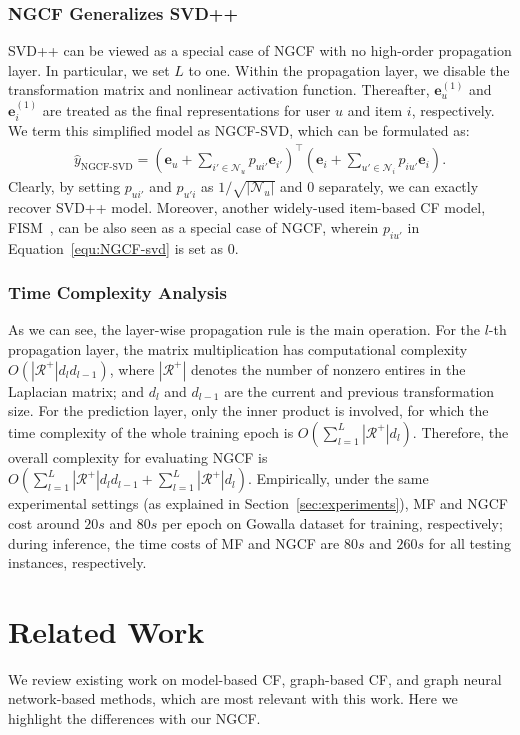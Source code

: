 \documentclass[sigconf]{acmart}
\newcommand{\Trans}[1]{{#1}^{\top}}
\newcommand{\Mat}[1]{\mathbf{#1}}
\newcommand{\Set}[1]{\mathcal{#1}}
\theoremstyle{definition}
\begin{document}
\subsubsection{\textbf{NGCF Generalizes SVD++}}\label{sec:generalize-mf-svd}
SVD++ can be viewed as a special case of NGCF with no high-order propagation layer.
In particular, we set $L$ to one.
Within the propagation layer, we disable the transformation matrix and nonlinear activation function.
Thereafter, $\Mat{e}^{(1)}_{u}$ and $\Mat{e}^{(1)}_{i}$ are treated as the final representations for user $u$ and item $i$, respectively.
We term this simplified model as NGCF-SVD, which can be formulated as:
\begin{align}\label{equ:NGCF-svd}
\hat{y}_{\text{NGCF-SVD}}=\Trans{(\Mat{e}_{u}+\sum_{i'\in\Set{N}_{u}}p_{ui'}\Mat{e}_{i'})}(\Mat{e}_{i}+\sum_{u'\in\Set{N}_{i}}p_{iu'}\Mat{e}_{i}).
\end{align}
Clearly, by setting $p_{ui'}$ and $p_{u'i}$ as $1/\sqrt{|\Set{N}_{u}|}$ and $0$ separately, we can exactly recover SVD++ model.
Moreover, another widely-used item-based CF model, FISM~\cite{FISM}, can be also seen as a special case of NGCF, wherein $p_{iu'}$ in Equation~\eqref{equ:NGCF-svd} is set as $0$.












\subsubsection{\textbf{Time Complexity Analysis}}\label{sec:complexity}
As we can see, the layer-wise propagation rule is the main operation.
For the $l$-th propagation layer, the matrix multiplication has computational complexity $O(|\Set{R}^{+}|d_{l}d_{l-1})$, where $|\Set{R}^{+}|$ denotes the number of nonzero entires in the Laplacian matrix; and $d_{l}$ and $d_{l-1}$ are the current and previous transformation size.
For the prediction layer, only the inner product is involved, for which the time complexity of the whole training epoch is $O(\sum_{l=1}^{L}|\Set{R}^{+}|d_{l})$.
Therefore, the overall complexity for evaluating NGCF is $O(\sum_{l=1}^{L}|\Set{R}^{+}|d_{l}d_{l-1}+\sum_{l=1}^{L}|\Set{R}^{+}|d_{l})$.
Empirically, under the same experimental settings (as explained in Section~\ref{sec:experiments}), MF and NGCF cost around $20s$ and $80s$ per epoch on Gowalla dataset for training, respectively;
during inference, the time costs of MF and NGCF are $80s$ and $260s$ for all testing instances, respectively. \section{Related Work}\label{sec:related-work}
We review existing work on model-based CF, graph-based CF, and graph neural network-based methods, which are most relevant with this work.
Here we highlight the differences with our NGCF.
\end{document}
